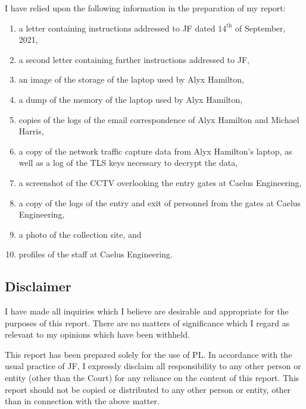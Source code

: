 \begin{myenum}
     \item I have relied upon the following information in the preparation of my report:
         \begin{enumerate}
            \item a letter containing instructions addressed to JF dated $14^\text{th}$ of September, 2021,
            \item a second letter containing further instructions addressed to JF,
            \item an image of the storage of the laptop used by Alyx Hamilton,
            \item a dump of the memory of the laptop used by Alyx Hamilton,
            \item copies of the logs of the email correspondence of Alyx Hamilton and Michael Harris,
            \item a copy of the network traffic capture data from Alyx Hamilton's laptop, as well as a log of the TLS keys necessary to decrypt the data,
            \item a screenshot of the CCTV overlooking the entry gates at Caelus Engineering,
            \item a copy of the logs of the entry and exit of personnel from the gates at Caelus Engineering,
            \item a photo of the collection site, and 
            \item profiles of the staff at Caelus Engineering.
         \end{enumerate}
\end{myenum}


\subsection{Disclaimer} %
\begin{myenum}
     \item I have made all inquiries which I believe are desirable and appropriate for the purposes of this report. There are no matters of significance which I regard as relevant to my opinions which have been withheld.
     \item This report has been prepared solely for the use of PL. In accordance with the usual practice of JF, I expressly disclaim all responsibility to any other person or entity (other than the Court) for any reliance on the content of this report. This report should not be copied or distributed to any other person or entity, other than in connection with the above matter.
\end{myenum}
\label{sub:disclaimer}


